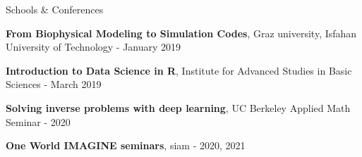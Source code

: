 \begin{rSection}{Schools \& Conferences}	
	\begin{rSubsection}{}{}{}{}
		\item \textbf{From Biophysical Modeling to Simulation Codes}, Graz university, Isfahan University of Technology - January 2019
		\item \textbf{Introduction to Data Science in R}, Institute for Advanced Studies in Basic Sciences - March 2019 %
		\item \textbf{Solving inverse problems with deep learning}, UC Berkeley Applied Math Seminar - 2020 
		\item \textbf{One World IMAGINE seminars}, siam - 2020, 2021
		
	\end{rSubsection}
\end{rSection}